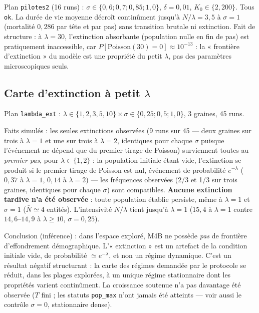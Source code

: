 \documentclass[11pt,a4paper]{article}
\newcommand{\code}[1]{\texttt{#1}}
\begin{document}
Plan \code{pilotes2} (16 runs) : $\sigma\in\{0{,}6;0{,}7;0{,}85;1{,}0\}$,
$\delta=0{,}01$, $K_0\in\{2,200\}$. Tous \code{ok}. La durée de vie
moyenne décroît continûment jusqu'à $N/\lambda=3{,}5$ à $\sigma=1$
(mortalité $0{,}286$ par tête et par pas) sans transition brutale ni
extinction. Fait de structure : à $\lambda=30$, l'extinction absorbante
(population nulle en fin de pas) est pratiquement inaccessible, car
$P[\mathrm{Poisson}(30)=0]\approx10^{-13}$ : la « frontière
d'extinction » du modèle est une propriété du petit $\lambda$, pas des
paramètres microscopiques seuls.

\subsection{Carte d'extinction à petit $\lambda$}
\label{sec:lambdaext}

Plan \code{lambda\_ext} : $\lambda\in\{1,2,3,5,10\}\times
\sigma\in\{0{,}25;0{,}5;1{,}0\}$, 3 graines, 45 runs.

Faits simulés : les seules extinctions observées (9 runs sur 45 —
deux graines sur trois à $\lambda=1$ et une sur trois à $\lambda=2$,
identiques pour chaque $\sigma$ puisque l'événement ne dépend que du
premier tirage de Poisson) surviennent toutes au \emph{premier pas},
pour $\lambda\in\{1,2\}$ :
la population initiale étant vide, l'extinction se produit si le premier
tirage de Poisson est nul, événement de probabilité $e^{-\lambda}$
($0{,}37$ à $\lambda=1$, $0{,}14$ à $\lambda=2$) — les fréquences
observées (2/3 et 1/3 sur trois graines, identiques pour chaque
$\sigma$) sont compatibles. \textbf{Aucune extinction tardive n'a été
observée} : toute population établie persiste, même à $\lambda=1$ et
$\sigma=1$ ($\bar N\simeq4$ entités). L'intensivité $N/\lambda$ tient
jusqu'à $\lambda=1$ ($15{,}4$ à $\lambda=1$ contre $14{,}6$--$14{,}9$ à
$\lambda\ge10$, $\sigma=0{,}25$).

Conclusion (inférence) : dans l'espace exploré, M4B ne possède
\emph{pas} de frontière d'effondrement démographique. L'« extinction »
est un artefact de la condition initiale vide, de probabilité
$\simeq e^{-\lambda}$, et non un régime dynamique. C'est un résultat
négatif structurant : la carte des régimes demandée par le protocole se
réduit, dans les plages explorées, à un unique régime stationnaire dont
les propriétés varient continûment. La croissance soutenue n'a pas
davantage été observée ($T$ fini ; les statuts \code{pop\_max} n'ont
jamais été atteints — voir aussi le contrôle $\sigma=0$, stationnaire
dense).
\end{document}
